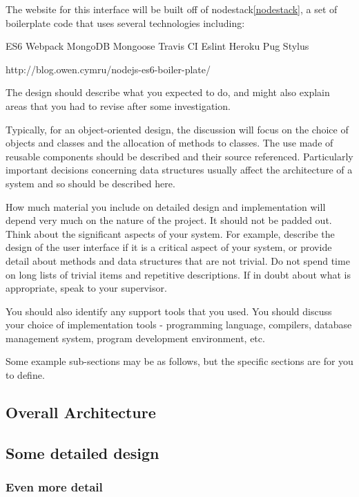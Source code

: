 The website for this interface will be built off of nodestack\ref{nodestack}, a set of boilerplate code that uses several technologies including:

ES6
Webpack
MongoDB
Mongoose
Travis CI
Eslint
Heroku
Pug
Stylus

http://blog.owen.cymru/nodejs-es6-boiler-plate/

The design should describe what you expected to do, and might also explain areas that you had to revise after some investigation.

Typically, for an object-oriented design, the discussion will focus on the choice of objects and classes and the allocation of methods to classes. The use made of reusable components should be described and their source referenced. Particularly important decisions concerning data structures usually affect the architecture of a system and so should be described here.

How much material you include on detailed design and implementation will depend very much on the nature of the project. It should not be padded out. Think about the significant aspects of your system. For example, describe the design of the user interface if it is a critical aspect of your system, or provide detail about methods and data structures that are not trivial. Do not spend time on long lists of trivial items and repetitive descriptions. If in doubt about what is appropriate, speak to your supervisor.
 
You should also identify any support tools that you used. You should discuss your choice of implementation tools - programming language, compilers, database management system, program development environment, etc.

Some example sub-sections may be as follows, but the specific sections are for you to define. 

\subsection{Overall Architecture}

\subsection{Some detailed design}

\subsubsection{Even more detail}

